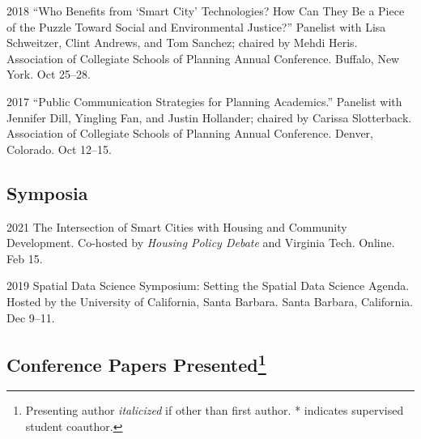 \documentclass[12pt,letterpaper]{report}
\begin{document}
\begin{tablist}
        \item[2018] \tab{}\enquote{Who Benefits from \enquote{Smart City} Technologies? How Can They Be a Piece of the Puzzle Toward Social and Environmental Justice?} Panelist with Lisa Schweitzer, Clint Andrews, and Tom Sanchez; chaired by Mehdi Heris. Association of Collegiate Schools of Planning Annual Conference. Buffalo, New York. Oct 25--28.

        \item[2017] \tab{}\enquote{Public Communication Strategies for Planning Academics.} Panelist with Jennifer Dill, Yingling Fan, and Justin Hollander; chaired by Carissa Slotterback. Association of Collegiate Schools of Planning Annual Conference. Denver, Colorado. Oct 12--15.

    \end{tablist}

    \subsection*{Symposia}

    \begin{tablist}

        \item[2021] \tab{}The Intersection of Smart Cities with Housing and Community Development. Co-hosted by \textit{Housing Policy Debate} and Virginia Tech. Online. Feb 15.

        \item[2019] \tab{}Spatial Data Science Symposium: Setting the Spatial Data Science Agenda. Hosted by the University of California, Santa Barbara. Santa Barbara, California. Dec 9--11.

    \end{tablist}

    \subsection*{Conference Papers Presented\footnote{Presenting author \textit{italicized} if other than first author. * indicates supervised student coauthor.}}
\end{document}
